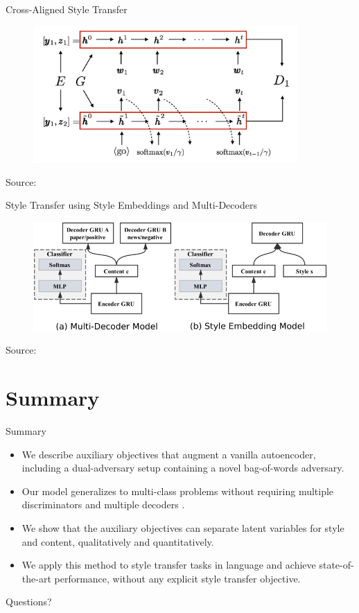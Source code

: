 \documentclass[aspectratio=169]{beamer}
\newcommand{\imgsrc}[1]{\tiny{Source: #1}}
\begin{document}
\begin{frame}{Cross-Aligned Style Transfer}
	\centering
	\begin{figure}[ht]
		\includegraphics[width=0.9\textwidth]{images/stca-cross-align}
	\end{figure}
	\imgsrc{\citet{shen2017style}}
\end{frame}

\begin{frame}{Style Transfer using Style Embeddings and Multi-Decoders}
	\centering
	\begin{figure}[ht]
		\includegraphics[width=\textwidth]{images/semb-architecture}
	\end{figure}
	\imgsrc{\citet{fu2017style}}
\end{frame}

% 

\section{Summary}

\begin{frame}{Summary}
	\begin{itemize}
		\item We describe auxiliary objectives that augment a vanilla autoencoder, including a dual-adversary setup containing a novel bag-of-words adversary.
		\item Our model generalizes to multi-class problems without requiring multiple discriminators \citep{hu2017toward,shen2017style} and multiple decoders \citep{fu2017style,prabhumoye2018style}.
		\item We show that the auxiliary objectives can separate latent variables for style and content, qualitatively and quantitatively.
		\item We apply this method to style transfer tasks in language and achieve state-of-the-art performance, without any explicit style transfer objective.
	\end{itemize}
\end{frame}

\begin{frame}[allowframebreaks]
	
	
\end{frame}

\begin{frame}
	\centering
	\Huge{Questions?}
\end{frame}
\end{document}
